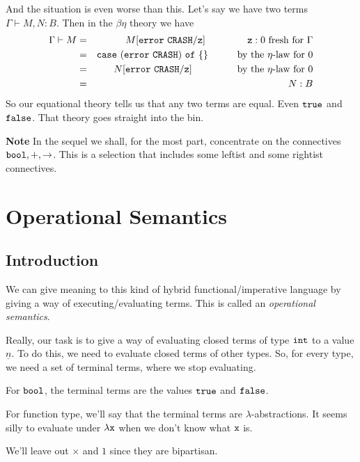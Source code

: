 \documentclass[runningheads,12pt]{llncs}
\begin{document}
And the situation is even worse than this.  Let's say we have two terms $\Gamma \vdash M, N : B$.    Then in the $\beta\eta$ theory we have
\begin{eqnarray*}
  \Gamma \vdash M & = & M[\tterror \mathtt{CRASH}/\ttz] \betwixt \betwixt \betwixt\betwixt \mbox{ $\ttz: 0$ fresh for $\Gamma$}  \\
 & = & \ttcase (\tterror \mathtt{CRASH}) \ttof \{\} \betwixt\betwixt \betwixt\mbox{by the $\eta$-law for 0} \\
& = & N[\tterror \mathtt{CRASH}/\ttz]  \betwixt\betwixt \betwixt \betwixt\ \mbox{  by the $\eta$-law for 0} \\
 & = & N : B
\end{eqnarray*}
So our equational theory tells us that any two terms are equal.  Even $\mathtt{true}$ and $\mathtt{false}$.  That theory goes straight into the bin.

{\bf Note} In the sequel we shall, for the most part, concentrate on the connectives $\mathtt{bool}, +, \to$.  This is a selection that includes some leftist and some rightist connectives.

\section{Operational Semantics}
\subsection{Introduction}

We can give meaning to this kind of hybrid functional/imperative language by giving a way of executing/evaluating terms.  This is called an \emph{operational semantics}.

Really, our task is to give a way of evaluating closed terms of type $\mathtt{int}$ to a value $\underline{n}$.   To do this, we need to evaluate closed terms of other types.  So, for every type, we need a set of terminal terms, where we stop evaluating.  

For $\mathtt{bool}$, the terminal terms are the values $\mathtt{true}$ and $\mathtt{false}$.

For function type, we'll say that the terminal terms are $\lambda$-abstractions.  It seems silly to evaluate under $\lambda\mathtt{x}$ when we don't know what $\mathtt{x}$ is.

We'll leave out $\times$ and $1$ since they are bipartisan.
\end{document}
